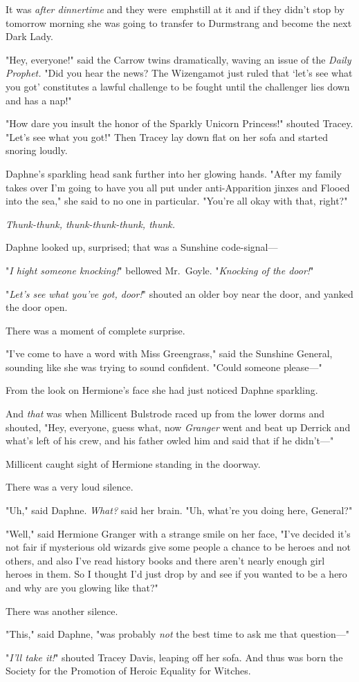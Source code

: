 It was \emph{after dinnertime} and they were\ emph{still at it} and if they 
didn't stop by tomorrow morning she was going to transfer to Durmstrang and 
become the next Dark Lady.

"Hey, everyone!" said the Carrow twins dramatically, waving an issue of the 
\emph{Daily Prophet.} "Did you hear the news? The Wizengamot just ruled that 
`let's see what you got' constitutes a lawful challenge to be fought until the 
challenger lies down and has a nap!"

"How dare you insult the honor of the Sparkly Unicorn Princess!" shouted 
Tracey. "Let's see what you got!" Then Tracey lay down flat on her sofa and 
started snoring loudly.

Daphne's sparkling head sank further into her glowing hands. "After my family 
takes over I'm going to have you all put under anti-Apparition jinxes and 
Flooed into the sea," she said to no one in particular. "You're all okay with 
that, right?"

\emph{Thunk-thunk, thunk-thunk-thunk, thunk.}

Daphne looked up, surprised; that was a Sunshine code-signal---

"\emph{I hight someone knocking!}" bellowed Mr.~Goyle. "\emph{Knocking of the 
door!}"

"\emph{Let's see what you've got, door!}" shouted an older boy near the door, 
and yanked the door open.

There was a moment of complete surprise.

"I've come to have a word with Miss Greengrass," said the Sunshine General, 
sounding like she was trying to sound confident. "Could someone please---"

From the look on Hermione's face she had just noticed Daphne sparkling.

And \emph{that} was when Millicent Bulstrode raced up from the lower dorms and 
shouted, "Hey, everyone, guess what, now \emph{Granger} went and beat up 
Derrick and what's left of his crew, and his father owled him and said that if 
he didn't---"

Millicent caught sight of Hermione standing in the doorway.

There was a very loud silence.

"Uh," said Daphne. \emph{What?} said her brain. "Uh, what're you doing here, 
General?"

"Well," said Hermione Granger with a strange smile on her face, "I've decided 
it's not fair if mysterious old wizards give some people a chance to be heroes 
and not others, and also I've read history books and there aren't nearly enough 
girl heroes in them. So I thought I'd just drop by and see if you wanted to be 
a hero and why are you glowing like that?"

There was another silence.

"This," said Daphne, "was probably \emph{not} the best time to ask me that 
question---"

"\emph{I'll take it!}" shouted Tracey Davis, leaping off her sofa.
\sbreak
And thus was born the Society for the Promotion of Heroic Equality for Witches.
